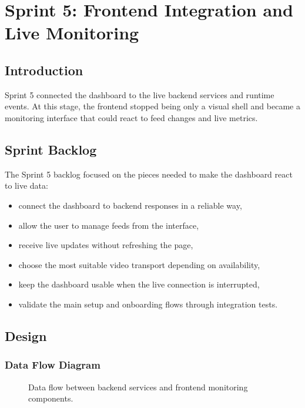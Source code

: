 \chapter{Sprint 5: Frontend Integration and Live Monitoring}
\chaptertoc

\clearpage

\section{Introduction}
Sprint 5 connected the dashboard to the live backend services and runtime events. At this stage, the frontend stopped being only a visual shell and became a monitoring interface that could react to feed changes and live metrics.

\section{Sprint Backlog}
The Sprint 5 backlog focused on the pieces needed to make the dashboard react to live data:
\begin{itemize}
    \item connect the dashboard to backend responses in a reliable way,
    \item allow the user to manage feeds from the interface,
    \item receive live updates without refreshing the page,
    \item choose the most suitable video transport depending on availability,
    \item keep the dashboard usable when the live connection is interrupted,
    \item validate the main setup and onboarding flows through integration tests.
\end{itemize}

\section{Design}

\subsection{Data Flow Diagram}
\begin{figure}[H]
    \centering
    \caption{Data flow between backend services and frontend monitoring components.}
    \label{fig:sprint5_data_flow}
\end{figure}

